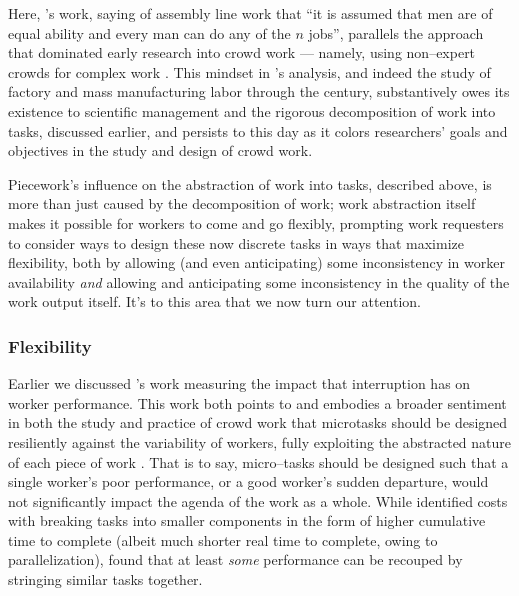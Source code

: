 \documentclass[trackingWork]{subfiles}
\begin{document}
Here, \citeauthor{hu1961parallel}'s work,
saying of assembly line work that
``it is assumed that men are of equal ability and every man can do any of the $n$ jobs'',
parallels the approach that dominated early research into crowd work
--- namely, using non--expert crowds for complex work
\cite{hu1961parallel}.
This mindset in \citeauthor{hu1961parallel}'s analysis,
and indeed the study of factory and mass manufacturing labor through the  century,
substantively owes its existence to scientific management
and the rigorous decomposition of work into tasks, discussed earlier,
and persists to this day as it colors
researchers' goals and objectives in the study and design of crowd work.

Piecework's influence on the abstraction of work into tasks,
described above, is more than just caused by the decomposition of work;
work abstraction itself makes it possible for workers to come and go flexibly,
prompting work requesters to consider ways to design these now discrete tasks in ways that
maximize flexibility, both by allowing (and even anticipating) some inconsistency in worker availability
\textit{and} allowing and anticipating some inconsistency in the quality of the work output itself.
It's to this area that we now turn our attention.










\subsubsection{Flexibility}\label{sec:flexibility}

Earlier we discussed \citeauthor{cheng2015break}'s work
measuring the impact that interruption has on worker performance.
This work both points to and embodies a broader sentiment in
both the study and practice
of crowd work that microtasks should be designed resiliently against the variability of workers,
fully exploiting the abstracted nature of each piece of work
\cite{interruptionIqbal,delayAndOrderLasecki,vaish2014low}.
That is to say, micro--tasks should be designed such that a single worker's poor performance,
or a good worker's sudden departure,
would not significantly impact the agenda of the work as a whole.
While \citeauthor{cheng2015break} identified costs with breaking tasks into smaller components
in the form of higher cumulative time to complete
(albeit much shorter real time to complete, owing to parallelization),
\citeauthor{delayAndOrderLasecki} found that at least \textit{some} performance can be recouped by stringing 
similar tasks together.
\end{document}
